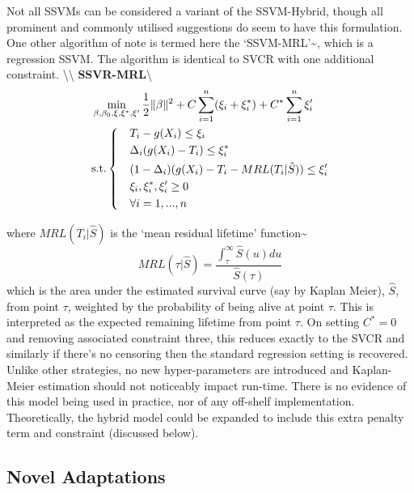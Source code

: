 \documentclass[
  letterpaper,
]{scrbook}
\theoremstyle{plain}
\theoremstyle{definition}
\theoremstyle{remark}
\begin{document}
Not all SSVMs can be considered a variant of the SSVM-Hybrid, though all
prominent and commonly utilised suggestions do seem to have this
formulation. One other algorithm of note is termed here the
`SSVM-MRL'\textasciitilde{}\cite{Goli2016a, Goli2016b}, which is a
regression SSVM. The algorithm is identical to SVCR with one additional
constraint. \textbackslash\textbackslash{}
\textbf{SSVR-MRL}\label{mod:ssvrmrl}\textbackslash{} \[
\begin{aligned}
& \min_{\beta, \beta_0, \xi, \xi^*,\xi'} \frac{1}{2}\|\beta\|^2 + C\sum^n_{i=1} (\xi_i + \xi_i^*) + C^*\sum^n_{i=1} \xi_i' \\
& \textrm{s.t.}
\begin{dcases}
& T_i - g(X_i) \leq \xi_i \\
& \Delta_i(g(X_i) - T_i) \leq \xi_i^* \\
& (1 - \Delta_i)(g(X_i) - T_i - MRL(T_i|\hat{S})) \leq \xi_i' \\
& \xi_i, \xi_i^*, \xi_i' \geq 0 \\
& \forall i = 1,...,n
\end{dcases}
\end{aligned}
\]

where \(MRL(T_i|\hat{S})\) is the `mean residual lifetime'
function\textasciitilde{}\cite{Klein2003} \[
MRL(\tau|\hat{S}) = \frac{\int^\infty_\tau \hat{S}(u) du}{\hat{S}(\tau)}
\] which is the area under the estimated survival curve (say by Kaplan
Meier), \(\hat{S}\), from point \(\tau\), weighted by the probability of
being alive at point \(\tau\). This is interpreted as the expected
remaining lifetime from point \(\tau\). On setting \(C^* = 0\) and
removing associated constraint three, this reduces exactly to the SVCR
and similarly if there's no censoring then the standard regression
setting is recovered. Unlike other strategies, no new hyper-parameters
are introduced and Kaplan-Meier estimation should not noticeably impact
run-time. There is no evidence of this model being used in practice, nor
of any off-shelf implementation. Theoretically, the hybrid model could
be expanded to include this extra penalty term and constraint (discussed
below).

\subsection{Novel Adaptations}
\end{document}
